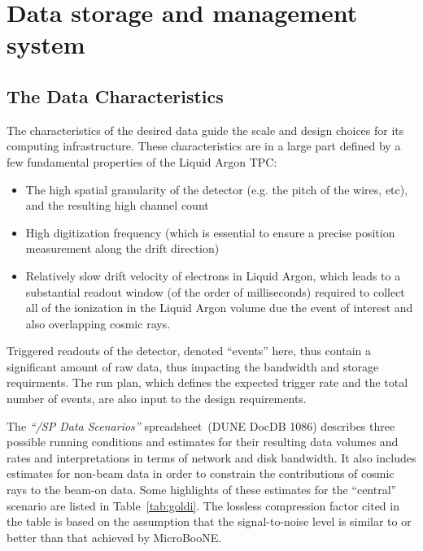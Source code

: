 \section{Data storage and management system}

\subsection{The \pd Data Characteristics}
The characteristics of the desired \pd data guide the scale and design
choices for its computing infrastructure.
These characteristics are in a large part defined by a few fundamental
properties of the \pd Liquid Argon TPC:
\begin{itemize}
\item The high spatial granularity of the detector (e.g. the pitch of the wires, etc), and the resulting high channel count
\item High digitization frequency (which is essential to ensure a precise position measurement along the drift direction)
\item Relatively slow drift velocity of electrons in Liquid Argon, which  leads to a substantial readout window (of the order of milliseconds) required to collect
all of the ionization in the Liquid Argon volume due the event of interest and also overlapping cosmic rays.
\end{itemize}

\noindent Triggered readouts of the detector, denoted ``events'' here, 
thus contain a significant amount of raw data, thus impacting the bandwidth and
storage requirments.   The run plan, which defines the expected trigger rate
and the total number of events, are also input to the design requirements.

The \textit{``\pd/SP Data Scenarios''} spreadsheet\,\cite{data_spreadsheet}
(DUNE DocDB 1086)
describes three possible running conditions and estimates for their
resulting data volumes and rates and interpretations in terms of
network and disk bandwidth.  It also includes estimates for non-beam
data in order to constrain the contributions of cosmic rays to the beam-on data.  Some highlights
of these estimates for the ``central'' scenario
are listed in Table~\ref{tab:goldi}. The lossless compression factor cited
in the table is based on the assumption that the signal-to-noise level 
is similar to or better than that achieved by MicroBooNE.

